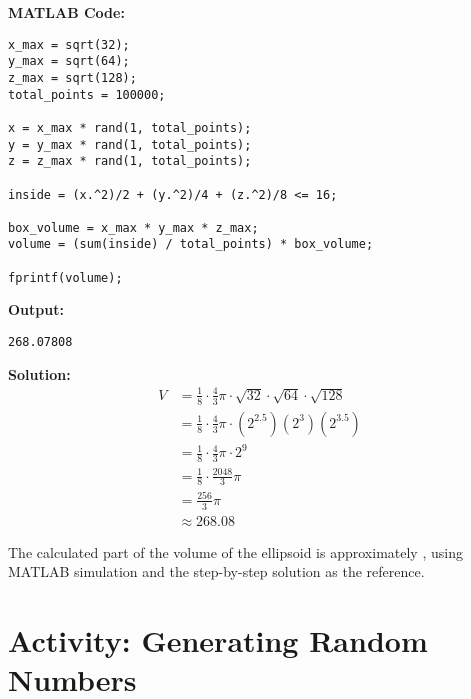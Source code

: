 \documentclass[legalpaper,11pt,extrafontsizes,oneside,openany,x11names]{memoir}
\begin{document}
\begin{enumerate}
    \textbf{MATLAB Code:}
    \begin{lstlisting}
x_max = sqrt(32);
y_max = sqrt(64);
z_max = sqrt(128);
total_points = 100000;

x = x_max * rand(1, total_points);
y = y_max * rand(1, total_points);
z = z_max * rand(1, total_points);

inside = (x.^2)/2 + (y.^2)/4 + (z.^2)/8 <= 16;

box_volume = x_max * y_max * z_max;
volume = (sum(inside) / total_points) * box_volume;

fprintf(volume);
    \end{lstlisting}

    \textbf{Output:}
    \begin{lstlisting}
268.07808
    \end{lstlisting}

\textbf{Solution:}
    \begin{align*}
V 
&= \frac{1}{8} \cdot \frac{4}{3} \pi \cdot \sqrt{32} \cdot \sqrt{64} \cdot \sqrt{128} \\
&= \frac{1}{8} \cdot \frac{4}{3} \pi \cdot (2^{2.5}) (2^3) (2^{3.5}) \\
&= \frac{1}{8} \cdot \frac{4}{3} \pi \cdot 2^9 \\
&= \frac{1}{8} \cdot \frac{2048}{3} \pi \\
&= \frac{256}{3} \pi \\
&\approx 268.08
\end{align*}

The calculated part of the volume of the ellipsoid is approximately , using MATLAB simulation and the step-by-step solution as the reference.

    
\end{enumerate}

\section*{Activity: Generating Random Numbers}
\end{document}
